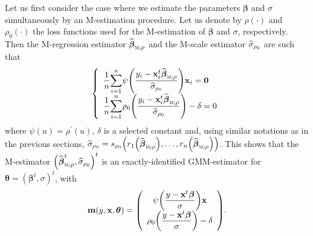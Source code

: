 Let us first consider the case where we estimate the parameters
$\boldsymbol\beta$ and $\sigma$ simultaneously by an M-estimation procedure.
Let us denote by $\rho\left(  \cdot\right)  $ and $\rho_{0}\left(
\cdot\right)  $ the loss functions used for the M-estimation of
$\boldsymbol\beta$ and $\sigma$, respectively. Then the M-regression
estimator $\sthat{\boldsymbol\beta}_{\stsc{M};\rho}$ and the M-scale
estimator $\widehat{\sigma}_{\rho_{0}}$ are such that
\begin{equation}
\left\{
\begin{array}
[c]{l}%
\dfrac{1}{n}%
{\displaystyle\sum\limits_{i=1}^{n}}
\psi\left(  \dfrac{y_{i}-\stvec{x}_{i}^{t}\sthat{\boldsymbol\beta%
}_{\stsc{M};\rho}}{\sthat{\sigma}_{\rho_{0}}}\right)  \stvec{x}%
_{i}=\mathbf{0}\\
\dfrac{1}{n}%
{\displaystyle\sum\limits_{i=1}^{n}}
\rho_{0}\left(  \dfrac{y_{i}-\stvec{x}_{i}^{t}\sthat{\boldsymbol\beta%
}_{\stsc{M};\rho}}{\sthat{\sigma}_{\rho_{0}}}\right)  -\delta=0
\end{array}
\right.  \label{Eq:GMM_equations_M}%
\end{equation}
where $\psi\left(  u\right)  =\rho^{\prime}\left(  u\right)  $, $\delta$ is a
selected constant and, using similar notations as in the previous sections,
$\sthat{\sigma}_{\rho_{0}}=s_{\rho_{0}}\left(  r_{1}\left(  \widehat
{\boldsymbol\beta}_{\stsc{M};\rho}\right)  ,\ldots,r_{n}\left(
\sthat{\boldsymbol\beta}_{\stsc{M};\rho}\right)  \right)  $. This shows
that the M-estimator $\left(  \sthat{\boldsymbol\beta}_{\stsc{M};\rho
}^{t},\sthat{\sigma}_{\rho_{0}}\right)  ^{t}$ is an exactly-identified
GMM-estimator for $\boldsymbol{\theta}=\left(  \boldsymbol\beta^{t}%
,\sigma\right)  ^{t}$, with
\begin{equation}
\mathbf{m}\left(  y,\stvec{x},\boldsymbol{\theta}\right)  =\left(
\begin{array}
[c]{c}%
\psi\left(  \dfrac{y-\stvec{x}^{t}\boldsymbol\beta}{\sigma}\right)
\stvec{x}\\
\rho_{0}\left(  \dfrac{y-\stvec{x}^{t}\boldsymbol\beta}{\sigma}\right)
-\delta
\end{array}
\right)  . \label{Eq:GMM_moment_function_M}%
\end{equation}


